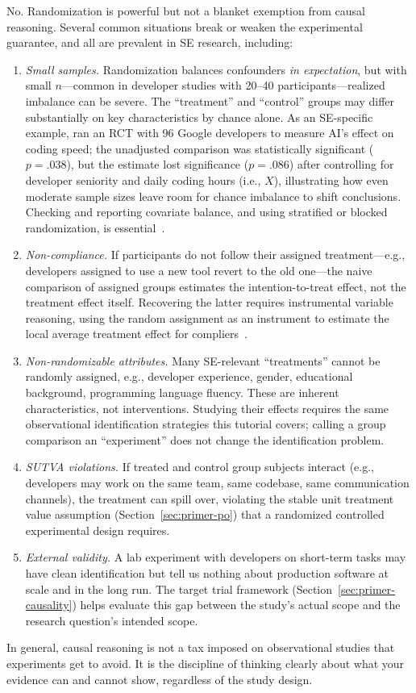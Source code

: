 No.
Randomization is powerful but not a blanket exemption from causal reasoning.
Several common situations break or weaken the experimental guarantee, and all are prevalent in SE research, including:
\begin{enumerate}[leftmargin=15pt]
    \item \emph{Small samples.}
    Randomization balances confounders \emph{in expectation}, but with small $n$---common in developer studies with 20--40 participants---realized imbalance can be severe.
    The ``treatment'' and ``control'' groups may differ substantially on key characteristics by chance alone.
    As an SE-specific example, \citet{DBLP:conf/icse-seip/ParadisGMNMMZFC25} ran an RCT with 96 Google developers to measure AI's effect on coding speed; the unadjusted comparison was statistically significant ($p = .038$), but the estimate lost significance ($p = .086$) after controlling for developer seniority and daily coding hours (i.e., $X$), illustrating how even moderate sample sizes leave room for chance imbalance to shift conclusions.
    Checking and reporting covariate balance, and using stratified or blocked randomization, is essential~\cite{DBLP:books/sp/WohlinRHORW24}.
    \item \emph{Non-compliance.}
    If participants do not follow their assigned treatment---e.g., developers assigned to use a new tool revert to the old one---the naive comparison of assigned groups estimates the intention-to-treat effect, not the treatment effect itself.
    Recovering the latter requires instrumental variable reasoning, using the random assignment as an instrument to estimate the local average treatment effect for compliers~\cite{angrist1996identification}.
    \item \emph{Non-randomizable attributes.}
    Many SE-relevant ``treatments'' cannot be randomly assigned, e.g., developer experience, gender, educational background, programming language fluency.
    These are inherent characteristics, not interventions.
    Studying their effects requires the same observational identification strategies this tutorial covers; calling a group comparison an ``experiment'' does not change the identification problem.
    \item \emph{SUTVA violations.}
    If treated and control group subjects interact (e.g., developers may work on the same team, same codebase, same communication channels), the treatment can spill over, violating the stable unit treatment value assumption (Section~\ref{sec:primer-po}) that a randomized controlled experimental design requires.
    \item \emph{External validity.}
    A lab experiment with developers on short-term tasks may have clean identification but tell us nothing about production software at scale and in the long run.
    The target trial framework (Section~\ref{sec:primer-causality}) helps evaluate this gap between the study's actual scope and the research question's intended scope.
\end{enumerate}
In general, causal reasoning is not a tax imposed on observational studies that experiments get to avoid.
It is the discipline of thinking clearly about what your evidence can and cannot show, regardless of the study design.

